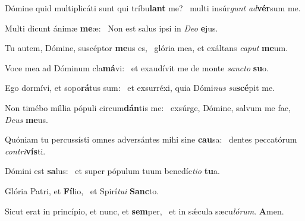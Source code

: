 \item Dómine quid multiplicáti sunt qui tríbu\textbf{lant} me?~\psstar{} multi insúr\textit{gunt} \textit{ad}\textbf{vér}sum me.
\item Multi dicunt ánimæ \textbf{me}æ:~\psstar{} Non est salus ipsi in \textit{Deo} \textbf{e}jus.
\item Tu autem, Dómine, suscéptor \textbf{me}us es,~\psstar{} glória mea, et exáltans \textit{caput} \textbf{me}um.
\item Voce mea ad Dóminum cla\textbf{má}vi:~\psstar{} et exaudívit me de monte \textit{sancto} \textbf{su}o.
\item Ego dormívi, et sopo\textbf{rá}tus sum:~\psstar{} et exsurréxi, quia Dómi\textit{nus} \textit{su}\textbf{scé}pit me.
\item Non timébo míllia pópuli circum\textbf{dán}tis me:~\psstar{} exsúrge, Dómine, salvum me fac, \textit{Deus} \textbf{me}us.
\item Quóniam tu percussísti omnes adversántes mihi sine \textbf{cau}sa:~\psstar{} dentes peccatórum \textit{contri}\textbf{vís}ti.
\item Dómini est \textbf{sa}lus:~\psstar{} et super pópulum tuum benedíc\textit{tio} \textbf{tu}a.
\item Glória Patri, et \textbf{Fí}lio,~\psstar{} et Spirí\textit{tui} \textbf{Sanc}to.
\item Sicut erat in princípio, et nunc, et \textbf{sem}per,~\psstar{} et in sǽcula sæcu\textit{lórum}. \textbf{A}men.
